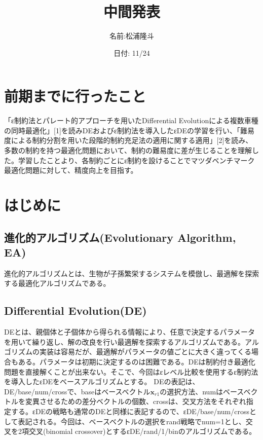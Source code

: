 \documentclass[twocolumn,10pt]{jarticle}
\title{中間発表}
\author{名前:松浦隆斗}
\date{日付: 11/24}
\begin{document}
\maketitle

\section{前期までに行ったこと}
「ε制約法とパレート的アプローチを用いたDifferential Evolutionによる複数車種の同時最適化」[1]を読みDEおよびε制約法を導入したεDEの学習を行い、「難易度による制約分割を用いた段階的制約充足法の適用に関する適用」[2]を読み、多数の制約を持つ最適化問題において、制約の難易度に差が生じることを理解した。学習したことより、各制約ごとにε制約を設けることでマツダベンチマーク最適化問題に対して、精度向上を目指す。

\section{はじめに}
\subsection{進化的アルゴリズム(Evolutionary Algorithm, EA)}
進化的アルゴリズムとは、生物が子孫繁栄するシステムを模倣し、最適解を探索する最適化アルゴリズムである。

\subsection{Differential Evolution(DE)}
DEとは、親個体と子個体から得られる情報により、任意で決定するパラメータを用いて繰り返し、解の改良を行い最適解を探索するアルゴリズムである。アルゴリズムの実装は容易だが、最適解がパラメータの値ごとに大きく違ってくる場合もある。パラメータは初期に決定するのは困難である。DEは制約付き最適化問題を直接解くことが出来ない。そこで、今回はεレベル比較を使用するε制約法を導入したεDEをベースアルゴリズムとする。
DEの表記は、DE/base/num/crossで、baseはベースベクトル$\bm{x}_{r1}$の選択方法、numはベースベクトルを変異させるための差分ベクトルの個数、crossは、交叉方法をそれぞれ指定する。εDEの戦略も通常のDEと同様に表記するので、εDE/base/num/crossとして表記される。今回は、ベースベクトルの選択をrand戦略でnum=1とし、交叉を2項交叉(binomial crossover)とするεDE/rand/1/binのアルゴリズムである。
\end{document}
